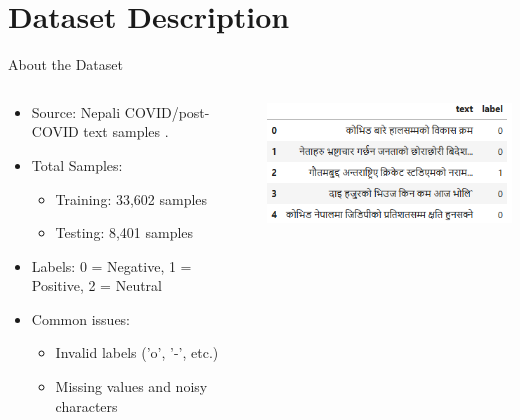 \documentclass[aspectratio=169]{beamer}
\begin{document}
\section{Dataset Description}
\begin{frame}{About the Dataset}
  \begin{columns}[T]
    \begin{column}{0.5\textwidth}
      \begin{itemize}
        \item Source: Nepali COVID/post-COVID text samples \parencite{aayam_ojha_2023,ajhesh72022nepali,shushant2021nepalisentiment,mahesh2022nepali}.
        \item Total Samples:
              \begin{itemize}
                \item Training: 33,602 samples
                \item Testing: 8,401 samples
              \end{itemize}
        \item Labels: 0 = Negative, 1 = Positive, 2 = Neutral
        \item Common issues:
              \begin{itemize}
                \item Invalid labels ('o', '-', etc.)
                \item Missing values and noisy characters
              \end{itemize}
      \end{itemize}
    \end{column}

    \begin{column}{0.45\textwidth}
    \centering
      \includegraphics[width=\textwidth]{DataSample.png}
    \end{column}
  \end{columns}
\end{frame}
\end{document}
